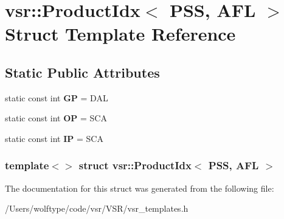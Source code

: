 \hypertarget{structvsr_1_1_product_idx_3_01_p_s_s_00_01_a_f_l_01_4}{\section{vsr\-:\-:Product\-Idx$<$ P\-S\-S, A\-F\-L $>$ Struct Template Reference}
\label{structvsr_1_1_product_idx_3_01_p_s_s_00_01_a_f_l_01_4}
}
\subsection*{Static Public Attributes}
\begin{DoxyCompactItemize}
\item 
\hypertarget{structvsr_1_1_product_idx_3_01_p_s_s_00_01_a_f_l_01_4_a31e2e6f86cbf185f654b1d8a8d1bdef8}{static const int {\bfseries G\-P} = D\-A\-L}\label{structvsr_1_1_product_idx_3_01_p_s_s_00_01_a_f_l_01_4_a31e2e6f86cbf185f654b1d8a8d1bdef8}

\item 
\hypertarget{structvsr_1_1_product_idx_3_01_p_s_s_00_01_a_f_l_01_4_a54827dca1c1490935f50ab8ac98caffb}{static const int {\bfseries O\-P} = S\-C\-A}\label{structvsr_1_1_product_idx_3_01_p_s_s_00_01_a_f_l_01_4_a54827dca1c1490935f50ab8ac98caffb}

\item 
\hypertarget{structvsr_1_1_product_idx_3_01_p_s_s_00_01_a_f_l_01_4_a2fd1876fa8f6b1c10823b709f25ec6e4}{static const int {\bfseries I\-P} = S\-C\-A}\label{structvsr_1_1_product_idx_3_01_p_s_s_00_01_a_f_l_01_4_a2fd1876fa8f6b1c10823b709f25ec6e4}

\end{DoxyCompactItemize}
\subsubsection*{template$<$$>$ struct vsr\-::\-Product\-Idx$<$ P\-S\-S, A\-F\-L $>$}



The documentation for this struct was generated from the following file\-:\begin{DoxyCompactItemize}
\item 
/\-Users/wolftype/code/vsr/\-V\-S\-R/vsr\-\_\-templates.\-h\end{DoxyCompactItemize}
